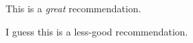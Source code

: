 \begin{recommendations}

    This is a \textit{great} recommendation.

    I guess this is a less-good recommendation.


\end{recommendations}
